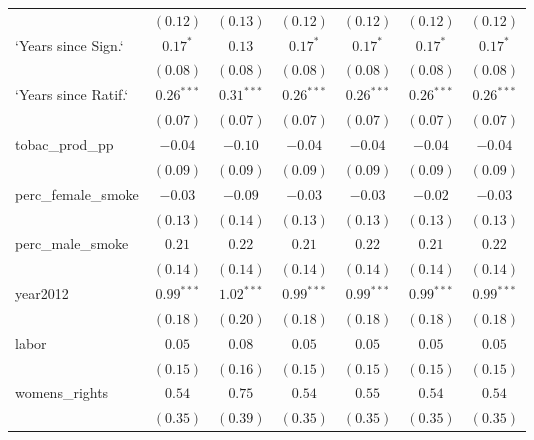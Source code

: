 \begin{table}[!h]
\begin{center}
\begin{tabular}{l c c c c c c }
                        & $(0.12)$     & $(0.13)$      & $(0.12)$     & $(0.12)$     & $(0.12)$     & $(0.12)$      \\
`Years since Sign.`     & $0.17^{*}$   & $0.13$        & $0.17^{*}$   & $0.17^{*}$   & $0.17^{*}$   & $0.17^{*}$    \\
                        & $(0.08)$     & $(0.08)$      & $(0.08)$     & $(0.08)$     & $(0.08)$     & $(0.08)$      \\
`Years since Ratif.`    & $0.26^{***}$ & $0.31^{***}$  & $0.26^{***}$ & $0.26^{***}$ & $0.26^{***}$ & $0.26^{***}$  \\
                        & $(0.07)$     & $(0.07)$      & $(0.07)$     & $(0.07)$     & $(0.07)$     & $(0.07)$      \\
tobac\_prod\_pp         & $-0.04$      & $-0.10$       & $-0.04$      & $-0.04$      & $-0.04$      & $-0.04$       \\
                        & $(0.09)$     & $(0.09)$      & $(0.09)$     & $(0.09)$     & $(0.09)$     & $(0.09)$      \\
perc\_female\_smoke     & $-0.03$      & $-0.09$       & $-0.03$      & $-0.03$      & $-0.02$      & $-0.03$       \\
                        & $(0.13)$     & $(0.14)$      & $(0.13)$     & $(0.13)$     & $(0.13)$     & $(0.13)$      \\
perc\_male\_smoke       & $0.21$       & $0.22$        & $0.21$       & $0.22$       & $0.21$       & $0.22$        \\
                        & $(0.14)$     & $(0.14)$      & $(0.14)$     & $(0.14)$     & $(0.14)$     & $(0.14)$      \\
year2012                & $0.99^{***}$ & $1.02^{***}$  & $0.99^{***}$ & $0.99^{***}$ & $0.99^{***}$ & $0.99^{***}$  \\
                        & $(0.18)$     & $(0.20)$      & $(0.18)$     & $(0.18)$     & $(0.18)$     & $(0.18)$      \\
labor                   & $0.05$       & $0.08$        & $0.05$       & $0.05$       & $0.05$       & $0.05$        \\
                        & $(0.15)$     & $(0.16)$      & $(0.15)$     & $(0.15)$     & $(0.15)$     & $(0.15)$      \\
womens\_rights          & $0.54$       & $0.75$        & $0.54$       & $0.55$       & $0.54$       & $0.54$        \\
                        & $(0.35)$     & $(0.39)$      & $(0.35)$     & $(0.35)$     & $(0.35)$     & $(0.35)$      \\

\end{tabular}
\end{center}
\end{table}
